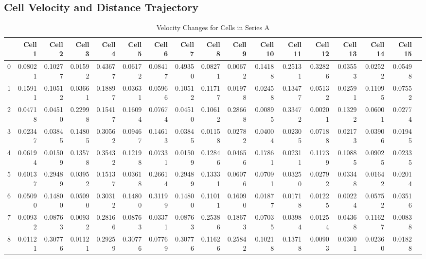 \documentclass{article}
\begin{document}
\subsection*{Cell Velocity and Distance Trajectory}

\begin{landscape} %
\begin{table}[htbp]
\centering
\caption{Velocity Changes for Cells in Series A }
\label{tab:velocity_changes}
\begin{tabular}{lrrrrrrrrrrrrrrrr}
\toprule
 & \textbf{Cell 1} & \textbf{Cell 2} & \textbf{Cell 3} & \textbf{Cell 4} & \textbf{Cell 5} & \textbf{Cell 6} & \textbf{Cell 7} & \textbf{Cell 8} & \textbf{Cell 9} & \textbf{Cell 10} & \textbf{Cell 11} & \textbf{Cell 12} & \textbf{Cell 13} & \textbf{Cell 14} & \textbf{Cell 15} \\
\midrule
0 & 0.08021 & 0.10277 & 0.01592 & 0.43677 & 0.06172 & 0.08417 & 0.49350 & 0.08271 & 0.00672 & 0.14188 & 0.25131 & 0.32826 & 0.03553 & 0.02522 & 0.05498 \\
1 & 0.15911 & 0.10512 & 0.03661 & 0.18897 & 0.03631 & 0.05966 & 0.10512 & 0.11717 & 0.01978 & 0.02458 & 0.13477 & 0.05132 & 0.02591 & 0.11095 & 0.07552 \\
2 & 0.04718 & 0.04510 & 0.22998 & 0.15417 & 0.16094 & 0.07674 & 0.04510 & 0.10612 & 0.28668 & 0.00895 & 0.33472 & 0.00201 & 0.13292 & 0.06001 & 0.02774 \\
3 & 0.02347 & 0.03845 & 0.14805 & 0.30562 & 0.09467 & 0.14613 & 0.03845 & 0.01158 & 0.02782 & 0.04004 & 0.02305 & 0.07188 & 0.02173 & 0.03906 & 0.01945 \\
4 & 0.06194 & 0.01509 & 0.13578 & 0.35432 & 0.12198 & 0.07331 & 0.01509 & 0.12846 & 0.04656 & 0.17861 & 0.02311 & 0.11739 & 0.10885 & 0.09025 & 0.02335 \\
5 & 0.60137 & 0.29489 & 0.03952 & 0.15137 & 0.03618 & 0.26614 & 0.29489 & 0.13331 & 0.06076 & 0.07091 & 0.03250 & 0.02792 & 0.03348 & 0.01642 & 0.02014 \\
6 & 0.05090 & 0.14800 & 0.05090 & 0.30312 & 0.14800 & 0.31199 & 0.14800 & 0.11011 & 0.16090 & 0.01877 & 0.01718 & 0.01225 & 0.00224 & 0.05752 & 0.03516 \\
7 & 0.00932 & 0.08763 & 0.00932 & 0.28166 & 0.08763 & 0.03371 & 0.08763 & 0.25386 & 0.18673 & 0.07035 & 0.03984 & 0.01254 & 0.04368 & 0.11627 & 0.00838 \\
8 & 0.01121 & 0.30776 & 0.01121 & 0.29259 & 0.30776 & 0.07769 & 0.30776 & 0.11626 & 0.25842 & 0.10218 & 0.13718 & 0.00903 & 0.03001 & 0.02360 & 0.01828 \\

\end{tabular}
\end{table}
\end{landscape}
\end{document}

